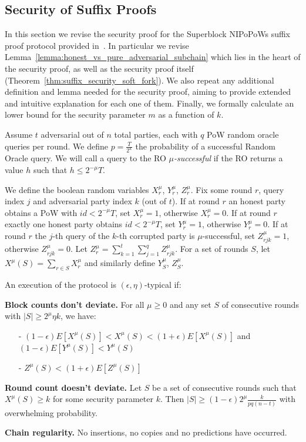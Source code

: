 \subsection{Security of Suffix Proofs} \label{proof_under_hard_fork}
In this section we revise the security proof for the Superblock NIPoPoWs suffix proof protocol provided in~\cite{nipopows}. In particular we revise Lemma~\ref{lemma:honest_vs_pure_adversarial_subchain} which lies in the heart of the security proof, as well as the security proof itself (Theorem~\ref{thm:suffix_security_soft_fork}). We also repeat any additional
definition and lemma needed for the security proof, aiming to provide extended and intuitive explanation for each one of them. Finally, we formally calculate an lower bound for the security parameter $m$ as a function of $k$.

Assume $t$ adversarial out of $n$ total parties, each with $q$ PoW random oracle
queries per round. We define $p = \frac{T}{2^\kappa}$ the probability of a
successful Random Oracle query. We will call a query to the RO $\mu$\textit{-successful}
if the RO returns a value $h$ such that $h \leq 2^{-\mu}T$.

We define the boolean random variables $X_r^{\mu}$, $Y_r^{\mu}$, $Z_r^{\mu}$.
Fix some round $r$, query index $j$ and adversarial party index $k$ (out of $t$).
If at round $r$ an honest party obtains a PoW with $id < 2^{-\mu}T$, set $X_r^{\mu} = 1$,
otherwise $X_r^{\mu} = 0$. If at round $r$ exactly one honest party obtains
$id < 2^{-\mu}T$, set $Y_r^{\mu} = 1$, otherwise $Y_r^{\mu} = 0$. If at round $
r$ the $j$-th query of the $k$-th corrupted party is $\mu$-successful, set
$Z_{rjk}^{\mu} = 1$, otherwise $Z_{rjk}^{\mu} = 0$. Let $Z_r^{\mu} =
\sum_{k=1}^t\sum_{j=1}^qZ_{rjk}^{\mu}$. For a set of rounds $S$, let
$X^\mu(S) = \sum_{r \in S}X^{\mu}_r$ and similarly define $Y_S^{\mu}$, $Z_S^{\mu}$.\\

\begin{defn}
	An execution of the protocol is $(\epsilon, \eta)$-typical if:
	
	\textbf{Block counts don't deviate.} For all $\mu \geq 0$ and any set
	$S$ of consecutive rounds with $\vert S \vert \geq 2^\mu \eta k$, we have:
	\begin{itemize}
		\item[-] $(1-\epsilon)E[X^\mu(S)] < X^\mu(S) < (1+\epsilon)E[X^\mu(S)] $ and
			$(1-\epsilon)E[Y^\mu(S)] < Y^\mu(S)$
		\item[-] $Z^\mu(S) < (1+\epsilon)E[Z^\mu(S)]$
\end{itemize}

	\textbf{Round count doesn't deviate.} Let $S$ be a set of consecutive rounds
	such that $X^\mu(S) \geq k$ for some security parameter $k$. Then $\vert S \vert
	\geq (1-\epsilon)2^\mu \frac{k}{pq(n-t)}$ with overwhelming probability.
	
	\textbf{Chain regularity.} No insertions, no copies and no predictions
	\cite{backbone} have occurred.
	\label{defn:typical_execution}
\end{defn}

